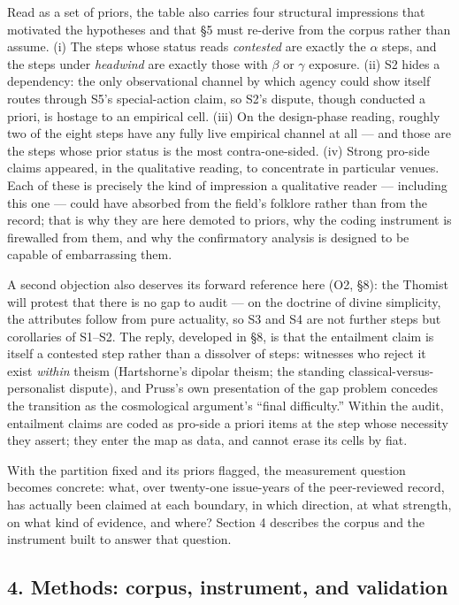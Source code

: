 Read as a set of priors, the table also carries four structural impressions that motivated the hypotheses and that \S{}5 must re-derive from the corpus rather than assume. (i) The steps whose status reads \emph{contested} are exactly the $\alpha$ steps, and the steps under \emph{headwind} are exactly those with $\beta$ or $\gamma$ exposure. (ii) S2 hides a dependency: the only observational channel by which agency could show itself routes through S5's special-action claim, so S2's dispute, though conducted a priori, is hostage to an empirical cell. (iii) On the design-phase reading, roughly two of the eight steps have any fully live empirical channel at all --- and those are the steps whose prior status is the most contra-one-sided. (iv) Strong pro-side claims appeared, in the qualitative reading, to concentrate in particular venues. Each of these is precisely the kind of impression a qualitative reader --- including this one --- could have absorbed from the field's folklore rather than from the record; that is why they are here demoted to priors, why the coding instrument is firewalled from them, and why the confirmatory analysis is designed to be capable of embarrassing them.

A second objection also deserves its forward reference here (O2, \S{}8): the Thomist will protest that there is no gap to audit --- on the doctrine of divine simplicity, the attributes follow from pure actuality, so S3 and S4 are not further steps but corollaries of S1--S2. The reply, developed in \S{}8, is that the entailment claim is itself a contested step rather than a dissolver of steps: witnesses who reject it exist \emph{within} theism (Hartshorne's dipolar theism; the standing classical-versus-personalist dispute), and Pruss's own presentation of the gap problem concedes the transition as the cosmological argument's ``final difficulty.'' Within the audit, entailment claims are coded as pro-side a priori items at the step whose necessity they assert; they enter the map as data, and cannot erase its cells by fiat.

With the partition fixed and its priors flagged, the measurement question becomes concrete: what, over twenty-one issue-years of the peer-reviewed record, has actually been claimed at each boundary, in which direction, at what strength, on what kind of evidence, and where? Section 4 describes the corpus and the instrument built to answer that question.

\subsection{4. Methods: corpus, instrument, and validation}\label{methods-corpus-instrument-and-validation}

